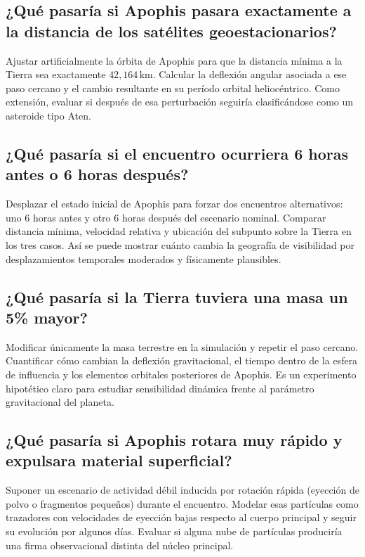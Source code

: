 \subsection{¿Qué pasaría si Apophis pasara exactamente a la distancia de los satélites geoestacionarios?}

Ajustar artificialmente la órbita de Apophis para que la distancia mínima a la Tierra sea exactamente $42{,}164\,\mathrm{km}$. Calcular la deflexión angular asociada a ese paso cercano y el cambio resultante en su período orbital heliocéntrico. Como extensión, evaluar si después de esa perturbación seguiría clasificándose como un asteroide tipo Aten.

\subsection{¿Qué pasaría si el encuentro ocurriera 6 horas antes o 6 horas después?}

Desplazar el estado inicial de Apophis para forzar dos encuentros alternativos: uno 6 horas antes y otro 6 horas después del escenario nominal. Comparar distancia mínima, velocidad relativa y ubicación del subpunto sobre la Tierra en los tres casos. Así se puede mostrar cuánto cambia la geografía de visibilidad por desplazamientos temporales moderados y físicamente plausibles.

\subsection{¿Qué pasaría si la Tierra tuviera una masa un 5\% mayor?}

Modificar únicamente la masa terrestre en la simulación y repetir el paso cercano. Cuantificar cómo cambian la deflexión gravitacional, el tiempo dentro de la esfera de influencia y los elementos orbitales posteriores de Apophis. Es un experimento hipotético claro para estudiar sensibilidad dinámica frente al parámetro gravitacional del planeta.

\subsection{¿Qué pasaría si Apophis rotara muy rápido y expulsara material superficial?}

Suponer un escenario de actividad débil inducida por rotación rápida (eyección de polvo o fragmentos pequeños) durante el encuentro. Modelar esas partículas como trazadores con velocidades de eyección bajas respecto al cuerpo principal y seguir su evolución por algunos días. Evaluar si alguna nube de partículas produciría una firma observacional distinta del núcleo principal.

